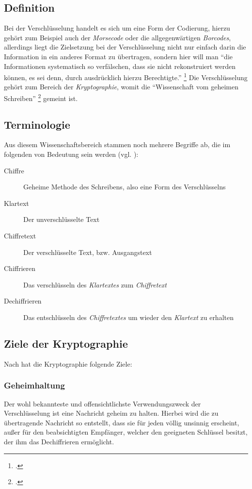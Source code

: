 \documentclass{scrarticle}
\begin{document}
    \subsection{Definition}
    Bei der Verschlüsselung handelt es sich um eine Form der Codierung, hierzu gehört zum Beispiel auch der \emph{Morsecode} oder die allgegenwärtigen \emph{Borcodes}, allerdings liegt die Zielsetzung bei der Verschlüsselung nicht nur einfach darin die Information in ein anderes Format zu übertragen, sondern hier will man \enquote{die Informationen systematisch so verfälschen, dass sie nicht rekonstruiert werden können, es sei denn, durch ausdrücklich hierzu Berechtigte.} \footcite[263]{dankmeier2006}
    Die Verschlüsselung gehört zum Bereich der \emph{Kryptographie}, womit die \enquote{Wissenschaft vom geheimen Schreiben} \footcite[1]{watjen2008} gemeint ist.

    \subsection*{Terminologie}
    Aus diesem Wissenschaftsbereich stammen noch mehrere Begriffe ab, die im folgenden von Bedeutung sein werden (vgl. \cite[17]{ertel2003}):
    \begin{description}
        \item[Chiffre] Geheime Methode des Schreibens, also eine Form des Verschlüsselns
        \item[Klartext] Der unverschlüsselte Text
        \item[Chiffretext] Der verschlüsselte Text, bzw. Ausgangstext
        \item[Chiffrieren] Das verschlüsseln des \emph{Klartextes} zum \emph{Chiffretext}
        \item[Dechiffrieren] Das entschlüsseln des \emph{Chiffretextes} um wieder den \emph{Klartext} zu erhalten
    \end{description}

    \subsection[Ziele]{Ziele der Kryptographie}
    Nach \cite[][16-21]{beutelspacher2015} hat die Kryptographie folgende Ziele:
    \subsubsection{Geheimhaltung}
    Der wohl bekannteste und offensichtlichste Verwendungszweck der Verschlüsselung ist eine Nachricht geheim zu halten. Hierbei wird die zu übertragende Nachricht so entstellt, dass sie für jeden völlig unsinnig erscheint, außer für den beabsichtigten Empfänger, welcher den geeigneten Schlüssel besitzt, der ihm das Dechiffrieren ermöglicht.
\end{document}
